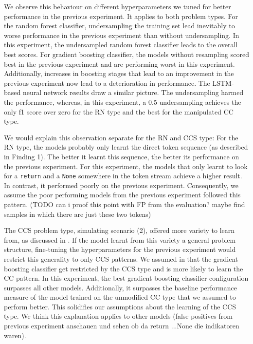 We observe this behaviour on different hyperparameters we tuned for better performance in the previous experiment. It applies to both problem types.
For the random forest classifier, undersampling the training set lead inevitably to worse performance in the previous experiment than without undersampling. In this experiment, the undersampled random forest classifier leads to the overall best scores. For gradient boosting classifier, the models without resampling scored best in the previous experiment and are performing worst in this experiment. Additionally, increases in boosting stages that lead to an improvement in the previous experiment now lead to a deterioration in performance. 
The LSTM-based neural network results draw a similar picture. The undersampling harmed the performance, whereas, in this experiment, a 0.5 undersampling achieves the only f1 score over zero for the RN type and the best for the manipulated CC type.

We would explain this observation separate for the RN and CCS type:
For the RN type, the models probably only learnt the direct token sequence (as described in Finding 1). The better it learnt this sequence, the better its performance on the previous experiment. For this experiment, the models that only learnt to look for a \texttt{return} and a \texttt{None} somewhere in the token stream achieve a higher result. In contrast, it performed poorly on the previous experiment. Consequently,  we assume the poor performing models from the previous experiment followed this pattern. (TODO can i proof this point with FP from the evaluation? maybe find samples in which there are just these two tokens)

The CCS problem type, simulating scenario (2), offered more variety to learn from, as discussed in . If the model learnt from this variety a general problem structure, fine-tuning the hyperparameters for the previous experiment would restrict this generality to only CCS patterns. We assumed in  that the gradient boosting classifier get restricted by the CCS type and is more likely to learn the CC pattern. In this experiment, the best gradient boosting classifier configuration surpasses all other models. Additionally, it surpasses the baseline performance measure of the model trained on the unmodified CC type that we assumed to perform better. This solidifies our assumptions about the learning of the CCS type. We think this explanation applies to other models (false positives from previous experiment anschauen und sehen ob da return ...None die indikatoren waren).

